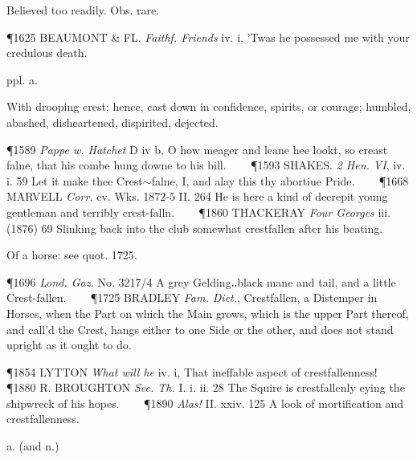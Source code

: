 \begin{description}[wide, labelwidth=!, labelindent=0pt]
\begin{myenumerate}
 Believed too readily. Obs. rare.

\P 1625 BEAUMONT \& FL.  \textit{Faithf. Friends} iv. i, 'Twas he possessed me with your credulous death.
\end{myenumerate}


 ppl. a.

\noindent {}

\vspace{-0.3cm}

\begin{myenumerate}
 With drooping crest; hence, cast down in confidence, spirits, or courage; humbled, abashed, disheartened, dispirited, dejected.

\P 1589 \textit{Pappe  w. Hatchet} D iv b, O how meager and leane hee lookt, so creast falne, that his combe hung downe to his bill.    
\P 1593 SHAKES.  \textit{2 Hen. VI}, iv. i. 59 Let it make thee Crest$\sim$falne, I, and alay this thy abortiue Pride.    
\P 1668 MARVELL  \textit{Corr.} cv. Wks. 1872-5 II. 264 He is here a kind of decrepit young gentleman and terribly crest-falln.    
\P 1860 THACKERAY  \textit{Four Georges} iii. (1876) 69 Slinking back into the club somewhat crestfallen after his beating.

 Of a horse: see quot. 1725.

\P 1696  \textit{Lond. Gaz.} No. 3217/4 A grey Gelding‥black mane and tail, and a little Crest-fallen.    
\P 1725 BRADLEY  \textit{Fam. Dict.}, Crestfallen, a Distemper in Horses, when the Part on which the Main grows, which is the upper Part thereof, and call'd the Crest, hangs either to one Side or the other, and does not stand upright as it ought to do.

\vspace{0.1cm} \noindent {}

\P 1854 LYTTON  \textit{What will he} iv. i, That ineffable aspect of crestfallenness!    
\P 1880 R. BROUGHTON  \textit{Sec. Th.} I. i. ii. 28 The Squire is crestfallenly eying the shipwreck of his hopes.    
\P 1890 \textit{Alas!} II. xxiv. 125 A look of mortification and crestfallenness.
\end{myenumerate}


 a. (and n.)

\noindent {}

\vspace{-0.3cm}


\end{description}
